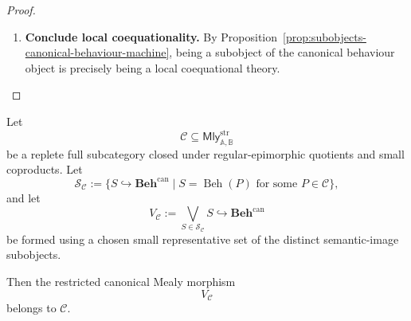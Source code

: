 \begin{proof}
\begin{enumerate}
        \item \textbf{Conclude local coequationality.}
        By Proposition~\ref{prop:subobjects-canonical-behaviour-machine},
        being a subobject of the canonical behaviour object is precisely being
        a local coequational theory.
    \end{enumerate}
\end{proof}

\begin{lemma}
\label{lem:representing-theory-belongs-to-class}
    Let
    \[
        \mathcal C
        \subseteq
        \mathsf{Mly}^{\mathrm{str}}_{\mathbb A,\mathbb B}
    \]
    be a replete full subcategory closed under regular-epimorphic quotients
    and small coproducts. Let
    \[
        \mathcal S_{\mathcal C}
        :=
        \{
            S\hookrightarrow\mathbf{Beh}^{\mathrm{can}}
            \mid
            S=\operatorname{Beh}(P)
            \text{ for some }P\in\mathcal C
        \},
    \]
    and let
    \[
        V_{\mathcal C}
        :=
        \bigvee_{S\in\mathcal S_{\mathcal C}}S
        \hookrightarrow
        \mathbf{Beh}^{\mathrm{can}}
    \]
    be formed using a chosen small representative set of the distinct
    semantic-image subobjects.

    Then the restricted canonical Mealy morphism
    \[
        V_{\mathcal C}
    \]
    belongs to \(\mathcal C\).
\end{lemma}

